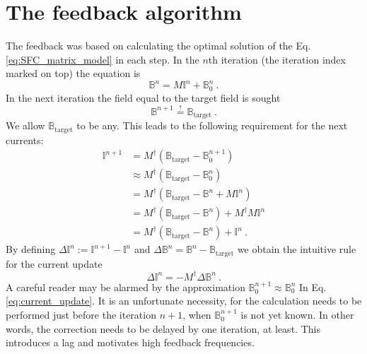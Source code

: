 \section{The feedback algorithm}
The feedback was based on calculating the optimal solution of the Eq.\,\ref{eq:SFC_matrix_model} in each step. In the $n$th iteration (the iteration index marked on top) the equation is
\begin{equation}
  \mathbb{B}^n = M \mathbb{I}^n + \mathbb{B}_0^n \ .
\end{equation}
In the next iteration the field equal to the target field is sought
\begin{equation}
  \mathbb{B}^{n+1} \overset{!}{=} \mathbb{B}_\text{target} \ .
\end{equation}
We allow $\mathbb{B}_\text{target}$ to be any. This leads to the following requirement for the next currents:
\begin{align}
  \mathbb{I}^{n+1} &=
    M^\dagger \left( \mathbb{B}_\text{target} - \mathbb{B}_0^{n+1} \right) \nonumber \\
    &\approx M^\dagger \left( \mathbb{B}_\text{target} - \mathbb{B}_0^{n} \right) \nonumber \\
    &= M^\dagger \left( \mathbb{B}_\text{target} - \mathbb{B}^n + M \mathbb{I}^n \right) \nonumber \\
    &= M^\dagger \left( \mathbb{B}_\text{target} - \mathbb{B}^n \right) + M^\dagger M \mathbb{I}^n \nonumber \\
    &= M^\dagger \left( \mathbb{B}_\text{target} - \mathbb{B}^n \right) + \mathbb{I}^n \ . \label{eq:current_update}
\end{align}
By defining $\Delta\mathbb{I}^n := \mathbb{I}^{n+1} - \mathbb{I}^{n}$ and $\Delta\mathbb{B}^n = \mathbb{B}^n - \mathbb{B}_\text{target}$ we obtain the intuitive rule for the current update
\begin{equation}
  \Delta\mathbb{I}^n = - M^\dagger \Delta\mathbb{B}^n \ .
\end{equation}
A careful reader may be alarmed by the approximation $\mathbb{B}_0^{n+1} \approx \mathbb{B}_0^{n}$ In Eq.\,\ref{eq:current_update}. It is an unfortunate necessity, for the calculation needs to be performed just before the iteration $n+1$, when $\mathbb{B}_0^{n+1}$ is not yet known. In other words, the correction needs to be delayed by one iteration, at least. This introduces a lag and motivates high feedback frequencies.

